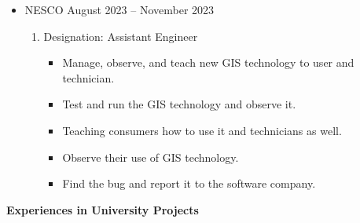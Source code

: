 \documentclass[a4paper,10pt]{article}
\begin{document}
\begin{itemize}

    \item NESCO  \hfill { August 2023 --  November 2023} \\[0.5em] 
    \begin{enumerate}[label=\Roman*.]
    \item {Designation:} Assistant Engineer \\[0.5em]
      \begin{itemize}
        \item {Manage, observe, and teach new GIS technology to user and technician. \\[1em]}
        \item {Test and run the GIS technology and observe it. \\[1em]}
        \item {Teaching consumers how to use it and technicians as well. \\[1em]}
        \item {Observe their use of GIS technology. \\[1em]}
        \item {Find the bug and report it to the software company. \\[1em]}
      \end{itemize}
    \end{enumerate}

    \vspace{1em}

    


\end{itemize}

\begin{tcolorbox}[colback=white, colframe=black, arc=3mm, boxrule=0.5mm, width=\textwidth]
    {\Large \textbf{Experiences in University Projects}}
\end{tcolorbox}
\end{document}

